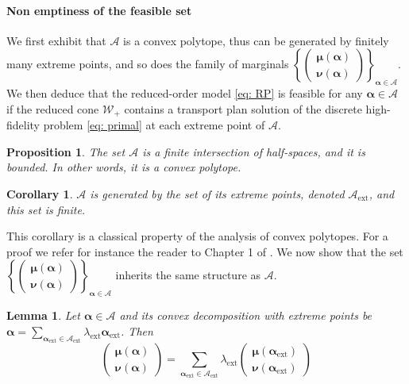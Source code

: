 \documentclass{article}
\def\cA{\mathcal{A}}
\def\cW{\mathcal{W}}
\def\aalpha{\boldsymbol{\alpha}}
\def\mmu{\boldsymbol{\mu}}
\def\nnu{\boldsymbol{\nu}}
\newtheorem{cor}[thm]{Corollary}
\newtheorem{prop}[thm]{Proposition}
\newtheorem{lem}[thm]{Lemma}
\begin{document}
\paragraph{Non emptiness of the feasible set}\label{subsubsection : non emptyness of the feasible set}
We first exhibit that  $\cA$ is a convex polytope, thus can be generated by finitely many extreme points, and so does the family of marginals $\left\lbrace \begin{pmatrix} \mmu(\aalpha) \\ \nnu(\aalpha) \end{pmatrix} \right\rbrace_{\aalpha \in \cA}$. We then deduce that the reduced-order model \eqref{eq: RP} is feasible for any $\aalpha \in \cA$ if the reduced cone $\cW_+$ contains a transport plan solution of the discrete high-fidelity problem \eqref{eq: primal} at each  extreme point of $\cA$. 
%
\begin{prop}
The set $\cA$ is a finite intersection of half-spaces, and it is bounded. In other words, it is a convex polytope.
\end{prop}
%
\begin{cor}\label{cor: finite number of extreme points}
  $\cA$ is generated by the set of its extreme points, denoted $\cA_{\text{ext}}$, and this set is finite.
\end{cor}
%
This corollary is a classical property of the analysis of convex polytopes. For a proof we refer for instance the reader to Chapter 1 of \cite{karloff2008linear}. We now show that the set $\left\lbrace \begin{pmatrix} \mmu(\aalpha) \\ \nnu(\aalpha) \end{pmatrix} \right\rbrace_{\aalpha \in \cA}$ inherits the same structure as $\cA$.
%
\begin{lem}\label{lemma: extreme marges}
  Let $\aalpha \in \cA$ and its convex decomposition with extreme points be $\displaystyle \aalpha = \sum_{\aalpha_{\text{ext}} \in \cA_{\text{ext}}} \lambda_{\text{ext}} \aalpha_{\text{ext}}$. Then
  \begin{equation}
      \begin{pmatrix}
          \mmu(\aalpha) \\ \nnu(\aalpha) 
      \end{pmatrix} = 
      \sum_{\aalpha_{\text{ext}} \in \cA_{\text{ext}}} \lambda_{\text{ext}} \begin{pmatrix}
          \mmu(\aalpha_{\text{ext}}) \\ \nnu(\aalpha_{\text{ext}}) 
      \end{pmatrix} 
  \end{equation}
\end{lem}
\end{document}
